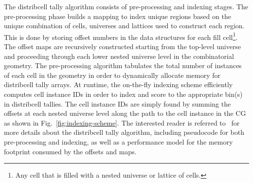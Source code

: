The distribcell tally algorithm consists of pre-processing and indexing stages. The pre-processing phase builds a mapping to index unique regions based on the unique combination of cells, universes and lattices used to construct each region. This is done by storing offset numbers in the data structures for each fill cell\footnote{Any cell that is filled with a nested universe or lattice of cells.}. The offset maps are recursively constructed starting from the top-level universe and proceeding through each lower nested universe level in the combinatorial geometry. The pre-processing algorithm tabulates the total number of instances of each cell in the geometry in order to dynamically allocate memory for distribcell tally arrays. At runtime, the on-the-fly indexing scheme efficiently computes cell instance IDs in order to index and score to the appropriate bin(s) in distribcell tallies. The cell instance IDs are simply found by summing the offsets at each nested universe level along the path to the cell instance in the \ac{CG} as shown in Fig.~\ref{fig:indexing-scheme}. The interested reader is referred to~\cite{lax2014distribcell} for more details about the distribcell tally algorithm, including pseudocode for both pre-processing and indexing, as well as a performance model for the memory footprint consumed by the offsets and maps.
  
